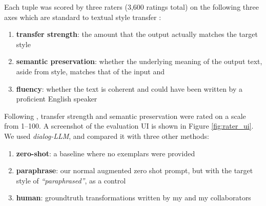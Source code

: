 Each tuple was scored by three raters (3,600 ratings total) on the following three axes which are standard to textual style transfer \citep{DBLP:journals/corr/abs-1904-02295}:

\begin{enumerate}
\item \textbf{transfer strength}: the amount that the output actually matches the target style
\item \textbf{semantic preservation}: whether the underlying meaning of the output text, aside from style, matches that of the input and
\item \textbf{fluency}: whether the text is coherent and could have been written by a proficient English speaker
\end{enumerate}

Following \citet{sakaguchi-van-durme-2018-efficient}, transfer strength and semantic preservation were rated on a scale from 1--100. A screenshot of the evaluation UI is shown in Figure \ref{fig:rater_ui}.
We used \textit{dialog-LLM}, and compared it with three other methods:

\begin{enumerate}
\item \textbf{zero-shot}: a baseline where no exemplars were provided
\item \textbf{paraphrase}: our normal augmented zero shot prompt, but with the target style of \textit{``paraphrased''}, as a control 
\item \textbf{human}: groundtruth transformations written by my and my collaborators
\end{enumerate}

